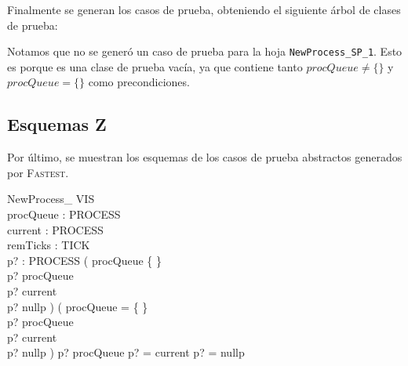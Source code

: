 \documentclass{article}
\begin{document}
\begin{minipage}{5cm}
\end{minipage}

Finalmente se generan los casos de prueba, obteniendo el siguiente árbol de clases de prueba:

\begin{minipage}{7cm}
\end{minipage}

Notamos que no se generó un caso de prueba para la hoja \verb|NewProcess_SP_1|. Esto es porque es una clase de prueba vacía, ya que contiene tanto $procQueue \neq \{\}$ y $procQueue = \{\}$ como precondiciones.

\subsection*{Esquemas Z}

Por último, se muestran los esquemas de los casos de prueba abstractos generados por \textsc{Fastest}.

\begin{schema}{NewProcess\_ VIS}\\
procQueue : \nat \pinj PROCESS \\
current : PROCESS \\
remTicks : TICK \\
p? : PROCESS 
\where
( procQueue \neq \{ \} \\
p? \notin \ran procQueue \\
p? \neq current \\
p? \neq nullp ) \lor ( procQueue = \{ \} \\
p? \notin \ran procQueue \\
p? \neq current \\
p? \neq nullp ) \lor p? \in \ran procQueue \lor p? = current \lor p? = nullp
\end{schema}
\end{document}
